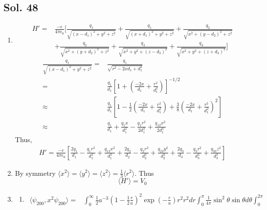\subsection*{Sol. 48}
\begin{enumerate}
    \item 
    \begin{align*}
        H' =& \frac{-e}{4\pi\epsilon_0}
        \bigg[\frac{q_1}{\sqrt{(x-d_1)^2+y^2+z^2}}
        +
        \frac{q_1}{\sqrt{(x+d_1)^2+y^2+z^2}}
        +\frac{q_2}{\sqrt{x^2+(y-d_2)^2+z^2}}\\
        &+\frac{q_2}{\sqrt{x^2+(y+d_2)^2+z^2}}
        +\frac{q_3}{\sqrt{x^2+y^2+(z-d_3)^2}}
        +\frac{q_3}{\sqrt{x^2+y^2+(z+d_3)^2}}
        \bigg]
    \end{align*}
    \begin{align*}
        \frac{q_1}{\sqrt{(x-d_1)^2+y^2+z^2}} = &
        \frac{q_1}{\sqrt{r^2 - 2xd_1 + d_1^2}}\\
        =&\frac{q_1}{d_1}
        \left[1+(\frac{-2x}{d_1}+\frac{r^2}{d_1^2})\right]^{-1/2}\\
        \approx&\frac{q_1}{d_1}\left[1-\frac{1}{2}(\frac{-2x}{d_1}+\frac{r^2}{d_1^2})+\frac{3}{8}
        (\frac{-2x}{d_1}+\frac{r^2}{d_1^2})^2\right]\\
        \approx &\frac{q_1}{d_1} 
        + \frac{q_1x}{d_1^2}-\frac{q_1r^2}{2d_1^3}
        +\frac{q_13x^2}{2d_1^3}
    \end{align*}
    Thus,
    \begin{align*}
        H'
        =\frac{-e}{4\pi\epsilon_0}
        \left[
        \frac{2q_1}{d_1} 
        -\frac{q_1r^2}{d_1^3}
        +\frac{q_13x^2}{d_1^3}
        +
        \frac{2q_2}{d_2} 
        -\frac{q_2r^2}{d_2^3}
        +\frac{q_23y^2}{d_2^3}
        +
        \frac{2q_3}{d_3} 
        -\frac{q_3r^2}{d_3^3}
        +\frac{q_33z^2}{d_3^3}
        \right]
    \end{align*}
    \item 
    By symmetry $\langle x^2\rangle=\langle y^2\rangle=\langle z^2\rangle=\frac{1}{3}\langle r^2\rangle.$ Thus 
    $$
    \langle H'\rangle=V_0
    $$
    \item 
    \begin{enumerate}
        \item 
        \begin{align*}
        \langle\psi_{200},x^2\psi_{200}\rangle=&
        \int_0^\infty 
        \frac{1}{2}a^{-3}\left(
        1-\frac{1}{2}\frac{r}{a}
        \right)^2
        \exp(-\frac{r}{a})r^2r^2
        dr\int_0^\pi \frac{1}{4\pi}\sin^2\theta\sin\theta d\theta \int_0^{2\pi}

\end{align*}
\end{enumerate}
\end{enumerate}
